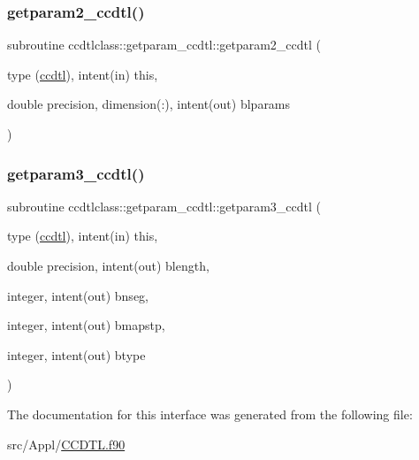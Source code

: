 \mbox{\label{interfaceccdtlclass_1_1getparam__ccdtl_a3902162821423941373ef12a3ad5de5f}} 
\subsubsection{\texorpdfstring{getparam2\_ccdtl()}{getparam2\_ccdtl()}}
{\footnotesize\ttfamily subroutine ccdtlclass\+::getparam\+\_\+ccdtl\+::getparam2\+\_\+ccdtl (\begin{DoxyParamCaption}\item[{type (\mbox{\hyperlink{namespaceccdtlclass_structccdtlclass_1_1ccdtl}{ccdtl}}), intent(in)}]{this,  }\item[{double precision, dimension(\+:), intent(out)}]{blparams }\end{DoxyParamCaption})}

\mbox{\label{interfaceccdtlclass_1_1getparam__ccdtl_a9d1046f5acff002e8457add43770fa9c}} 
\subsubsection{\texorpdfstring{getparam3\_ccdtl()}{getparam3\_ccdtl()}}
{\footnotesize\ttfamily subroutine ccdtlclass\+::getparam\+\_\+ccdtl\+::getparam3\+\_\+ccdtl (\begin{DoxyParamCaption}\item[{type (\mbox{\hyperlink{namespaceccdtlclass_structccdtlclass_1_1ccdtl}{ccdtl}}), intent(in)}]{this,  }\item[{double precision, intent(out)}]{blength,  }\item[{integer, intent(out)}]{bnseg,  }\item[{integer, intent(out)}]{bmapstp,  }\item[{integer, intent(out)}]{btype }\end{DoxyParamCaption})}



The documentation for this interface was generated from the following file\+:\begin{DoxyCompactItemize}
\item 
src/\+Appl/\mbox{\hyperlink{_c_c_d_t_l_8f90}{C\+C\+D\+T\+L.\+f90}}\end{DoxyCompactItemize}
